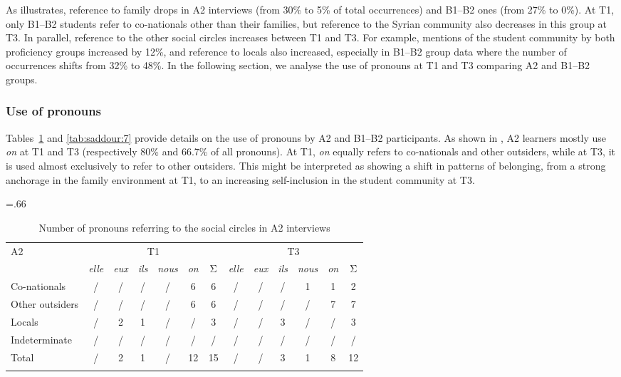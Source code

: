 \documentclass[output=paper]{langscibook}
\begin{document}
As  illustrates, reference to family drops in A2 interviews (from 30\% to 5\% of total occurrences) and B1–B2 ones (from 27\% to 0\%). At T1, only B1–B2 students refer to co-nationals other than their families, but reference to the Syrian community also decreases in this group at T3. In parallel, reference to the other social circles increases between T1 and T3. For example, mentions of the student community by both proficiency groups increased by 12\%, and reference to locals also increased, especially in B1–B2 group data where the number of occurrences shifts from 32\% to 48\%. In the following section, we analyse the use of pronouns at T1 and T3 comparing A2 and B1–B2 groups.

\subsubsection{Use of pronouns}\label{sec:saddour:3.1.2}

Tables~\ref{tab:saddour:6} and \ref{tab:saddour:7} provide details on the use of pronouns by A2 and B1–B2 participants. As shown in , A2 learners mostly use \textit{on} at T1 and T3 (respectively 80\% and 66.7\% of all pronouns). At T1, \textit{on} equally refers to co-nationals and other outsiders, while at T3, it is used almost exclusively to refer to other outsiders. This might be interpreted as showing a shift in patterns of belonging, from a strong anchorage in the family environment at T1, to an increasing self-inclusion in the student community at T3.

\begin{table}
\tabcolsep=.66\tabcolsep
\begin{tabular}{lcccccccccccc}
\lsptoprule
 {A2} & \multicolumn{6}{c}{{T1}}  & \multicolumn{6}{c}{{T3}}\\\cmidrule(lr){2-7}\cmidrule(lr){8-13}
& {\textit{elle}} & {\textit{eux}} & {\textit{ils}} & {\textit{nous}} & {\textit{on}} & {Σ} & {\textit{elle}} & {\textit{eux}} & {\textit{ils}} & {\textit{nous}} & {\textit{on}} & {Σ}\\
\midrule
Co-nationals & / & / & / & / & 6 & 6 & / & / & / & 1 & 1 & 2\\
Other outsiders & / & / & / & / & 6 & 6 & / & / & / & / & 7 & 7\\
{Locals} & / & 2 & 1 & / & / & 3 & / & / & 3 & / & / & 3\\
{Indeterminate} & / & / & / & / & / & / & / & / & / & / & / & /\\
\midrule
{Total} & / & 2 & 1 & / & 12 & 15 & / & / & 3 & 1 & 8 & 12\\
\lspbottomrule
\end{tabular}
 \caption{Number of pronouns referring to the social circles in A2 interviews\label{tab:saddour:6}}
\end{table}
\end{document}
